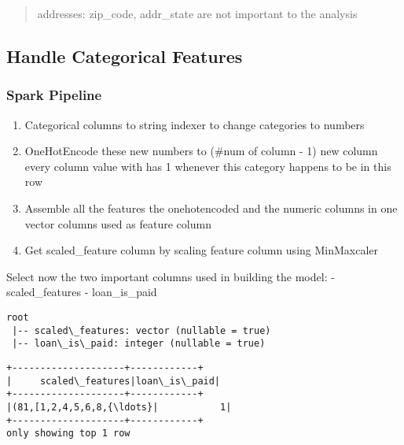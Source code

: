 \documentclass[11pt]{article}
\providecommand{\tightlist}{%
      \setlength{\itemsep}{0pt}\setlength{\parskip}{0pt}}
\begin{document}
\begin{quote}
addresses: zip\_code, addr\_state are not important to the analysis
\end{quote}

    \hypertarget{handle-categorical-features}{%
\subsection{Handle Categorical
Features}\label{handle-categorical-features}}

    \hypertarget{spark-pipeline}{%
\subsubsection{Spark Pipeline}\label{spark-pipeline}}

\begin{enumerate}
\def\labelenumi{\arabic{enumi}.}
\tightlist
\item
  Categorical columns to string indexer to change categories to numbers
\item
  OneHotEncode these new numbers to (\#num of column - 1) new column
  every column value with has 1 whenever this category happens to be in
  this row
\item
  Assemble all the features the onehotencoded and the numeric columns in
  one vector columns used as feature column
\item
  Get scaled\_feature column by scaling feature column using MinMaxcaler
\end{enumerate}

    Select now the two important columns used in building the model: -
scaled\_features - loan\_is\_paid

    \begin{Verbatim}[commandchars=\\\{\}]
root
 |-- scaled\_features: vector (nullable = true)
 |-- loan\_is\_paid: integer (nullable = true)

    \end{Verbatim}

    \begin{Verbatim}[commandchars=\\\{\}]
+--------------------+------------+
|     scaled\_features|loan\_is\_paid|
+--------------------+------------+
|(81,[1,2,4,5,6,8,{\ldots}|           1|
+--------------------+------------+
only showing top 1 row

    \end{Verbatim}
\end{document}
